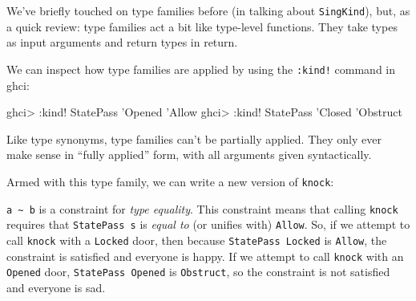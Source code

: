 \documentclass[]{article}
\newenvironment{Shaded}{}{}
\newcommand{\CommentTok}[1]{\textcolor[rgb]{0.38,0.63,0.69}{\textit{#1}}}
\newcommand{\DataTypeTok}[1]{\textcolor[rgb]{0.56,0.13,0.00}{#1}}
\newcommand{\FunctionTok}[1]{\textcolor[rgb]{0.02,0.16,0.49}{#1}}
\newcommand{\NormalTok}[1]{#1}
\newcommand{\OtherTok}[1]{\textcolor[rgb]{0.00,0.44,0.13}{#1}}
\newcommand{\StringTok}[1]{\textcolor[rgb]{0.25,0.44,0.63}{#1}}
\begin{document}
We've briefly touched on type families before (in talking about
\texttt{SingKind}), but, as a quick review: type families act a bit like
type-level functions. They take types as input arguments and return types in
return.

We can inspect how type families are applied by using the \texttt{:kind!}
command in ghci:

\begin{Shaded}
\begin{Highlighting}[]
\NormalTok{ghci}\FunctionTok{>} \FunctionTok{:}\NormalTok{kind}\FunctionTok{!} \DataTypeTok{StatePass}\NormalTok{ '}\DataTypeTok{Opened}
\NormalTok{'}\DataTypeTok{Allow}
\NormalTok{ghci}\FunctionTok{>} \FunctionTok{:}\NormalTok{kind}\FunctionTok{!} \DataTypeTok{StatePass}\NormalTok{ '}\DataTypeTok{Closed}
\NormalTok{'}\DataTypeTok{Obstruct}
\end{Highlighting}
\end{Shaded}

Like type synonyms, type families can't be partially applied. They only ever
make sense in ``fully applied'' form, with all arguments given syntactically.

Armed with this type family, we can write a new version of \texttt{knock}:

\begin{Shaded}
\end{Shaded}

\texttt{a\ \textasciitilde{}\ b} is a constraint for \emph{type equality}. This
constraint means that calling \texttt{knock} requires that \texttt{StatePass\ s}
is \emph{equal to} (or unifies with) \texttt{\textquotesingle{}Allow}. So, if we
attempt to call \texttt{knock} with a \texttt{\textquotesingle{}Locked} door,
then because \texttt{StatePass\ \textquotesingle{}Locked} is
\texttt{\textquotesingle{}Allow}, the constraint is satisfied and everyone is
happy. If we attempt to call \texttt{knock} with an
\texttt{\textquotesingle{}Opened} door,
\texttt{StatePass\ \textquotesingle{}Opened} is
\texttt{\textquotesingle{}Obstruct}, so the constraint is not satisfied and
everyone is sad.
\end{document}
